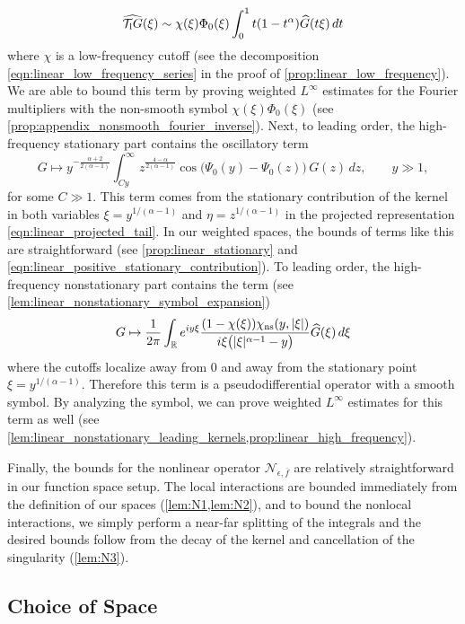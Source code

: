 \documentclass[11pt]{amsart}
\theoremstyle{definition}
\theoremstyle{remark}
\numberwithin{equation}{section}
\newcommand{\mc}[1]{\mathcal{#1}}
\newcommand{\ov}[1]{\overline{#1}}
\begin{document}
\[\widehat{\mc{T}_{\textup{l}}G}(\xi) \sim \chi(\xi)\Phi_0(\xi)\int_{0}^{1}t(1 - t^{\alpha})\widehat{G}(t\xi) \, dt\]
where $\chi$ is a low-frequency cutoff (see the decomposition \eqref{eqn:linear_low_frequency_series} in the proof of \cref{prop:linear_low_frequency}). We are able to bound this term by proving weighted $L^\infty$ estimates for the Fourier multipliers with the non-smooth symbol $\chi(\xi)\Phi_0(\xi)$ (see \cref{prop:appendix_nonsmooth_fourier_inverse}). Next, to leading order, the high-frequency stationary part contains the oscillatory term
\begin{equation}\label{eqn:main_ideas_high_frequency_stationary}
G \mapsto
y^{-\frac{\alpha+2}{2(\alpha-1)}}
\int_{Cy}^\infty
z^{\frac{4-\alpha}{2(\alpha-1)}}
\cos \bigl(\Psi_0(y)-\Psi_0(z)\bigr)\,G(z)\,dz,
\qquad y\gg1,
\end{equation}
for some $C \gg 1$. This term comes from the stationary contribution of the kernel in both variables $\xi = y^{1/(\alpha-1)}$ and $\eta = z^{1/(\alpha - 1)}$ in the projected representation \eqref{eqn:linear_projected_tail}. In our weighted spaces, the bounds of terms like this are straightforward (see \cref{prop:linear_stationary} and \eqref{eqn:linear_positive_stationary_contribution}). To leading order, the high-frequency nonstationary part contains the term (see \cref{lem:linear_nonstationary_symbol_expansion})
\[G \mapsto 
\frac1{2\pi}\int_{\mathbb R}e^{iy\xi}
\frac{(1-\chi(\xi))\chi_{\textup{ns}}(y,|\xi|)}
{i\xi\bigl(|\xi|^{\alpha-1}-y\bigr)}
\widehat G(\xi)\,d\xi
\]
where the cutoffs localize away from $0$ and away from the stationary point $\xi = y^{1/(\alpha-1)}$. Therefore this term is a pseudodifferential operator with a smooth symbol. By analyzing the symbol, we can prove weighted $L^\infty$ estimates for this term as well (see \cref{lem:linear_nonstationary_leading_kernels,prop:linear_high_frequency}). \par
Finally, the bounds for the nonlinear operator $\mc{N}_{\epsilon, \ov{f}}$ are relatively straightforward in our function space setup. The local interactions are bounded immediately from the definition of our spaces (\cref{lem:N1,lem:N2}), and to bound the nonlocal interactions, we simply perform a near-far splitting of the integrals and the desired bounds follow from the decay of the kernel and cancellation of the singularity (\cref{lem:N3}).

\subsection{Choice of Space}\label{sec:choice_of_space}
\end{document}
